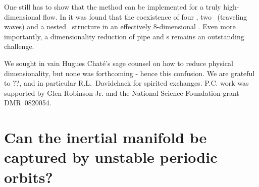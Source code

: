 One still has to show that the method can be implemented for a truly
high-dimensional flow. In  it was found that the
coexistence of four \eqva, two \reqva\ (traveling waves) and a nested
\fixedsp\ structure in an effectively $8$-dimensional \KS. Even more
importantly, a dimensionality reduction of pipe and \pCf s remains an
outstanding challenge.


	\medskip
We sought in vain Hugues Chat\'e's sage counsel on how to reduce
physical dimensionality, but none was forthcoming - hence this
confusion.
We are grateful to
??,
and in particular R.L.~Davidchack
for spirited exchanges.
P.C. work was supported by  Glen Robinson Jr.
and the National Science Foundation grant
DMR~0820054. 	



\Remarks


\RemarksEnd

\section{Can the inertial manifold be captured by unstable periodic orbits?}
\label{sec:TaCh11}

